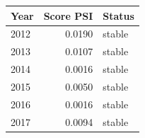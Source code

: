 \begin{tabular}{lrl}
\toprule
Year & Score PSI & Status \\
\midrule
2012 & 0.0190 & stable \\
2013 & 0.0107 & stable \\
2014 & 0.0016 & stable \\
2015 & 0.0050 & stable \\
2016 & 0.0016 & stable \\
2017 & 0.0094 & stable \\
\bottomrule
\end{tabular}
